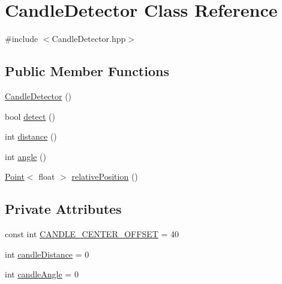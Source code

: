 \hypertarget{classCandleDetector}{\section{Candle\-Detector Class Reference}
\label{classCandleDetector}
}


{\ttfamily \#include $<$Candle\-Detector.\-hpp$>$}

\subsection*{Public Member Functions}
\begin{DoxyCompactItemize}
\item 
\hyperlink{classCandleDetector_ad018cfcc4256482dcc093cca4411fea6}{Candle\-Detector} ()
\item 
bool \hyperlink{classCandleDetector_a8b9d654f3be7f3ae44d4e1fc07d08b51}{detect} ()
\item 
int \hyperlink{classCandleDetector_a01619df190ca44d8171055b49e81444f}{distance} ()
\item 
int \hyperlink{classCandleDetector_a69d5ea11e04eaa51214c3a786eec7455}{angle} ()
\item 
\hyperlink{classPoint}{Point}$<$ float $>$ \hyperlink{classCandleDetector_a773abb6491519a0d1b7111e2973c7199}{relative\-Position} ()
\end{DoxyCompactItemize}
\subsection*{Private Attributes}
\begin{DoxyCompactItemize}
\item 
const int \hyperlink{classCandleDetector_a9920f067f44f9dc8aab6747699a244f7}{C\-A\-N\-D\-L\-E\-\_\-\-C\-E\-N\-T\-E\-R\-\_\-\-O\-F\-F\-S\-E\-T} = 40
\item 
int \hyperlink{classCandleDetector_a3d4f2c951c77838bfc5c068b58cf9fda}{candle\-Distance} = 0
\item 
int \hyperlink{classCandleDetector_a043c3f35890b36e187734a492f96f84c}{candle\-Angle} = 0
\end{DoxyCompactItemize}

